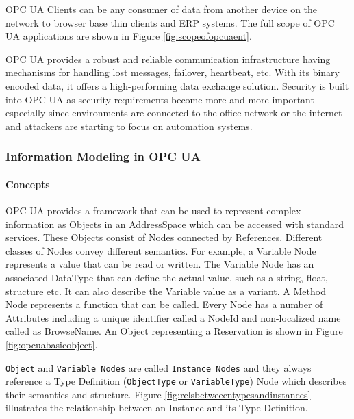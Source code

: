 OPC UA Clients can be any consumer of data from another device on the network to browser base thin clients and ERP systems. The full scope of OPC UA applications are shown in Figure \ref{fig:scopeofopcuaent}.


\FloatBarrier

OPC UA provides a robust and reliable communication infrastructure having mechanisms for handling lost messages, failover, heartbeat, etc. With its binary encoded data, it offers a high-performing data exchange solution. Security is built into OPC UA as security requirements become more and more important especially since environments are connected to the office network or the internet and attackers are starting to focus on automation systems.

\subsubsection{Information Modeling in OPC UA}

\paragraph{Concepts}

OPC UA provides a framework that can be used to represent complex information as Objects in an AddressSpace which can be accessed with standard services. These Objects consist of Nodes connected by References. Different classes of Nodes convey different semantics. For example, a Variable Node represents a value that can be read or written. The Variable Node has an associated DataType that can define the actual value, such as a string, float, structure etc. It can also describe the Variable value as a variant. A Method Node represents a function that can be called. Every Node has a number of Attributes including a unique identifier called a NodeId and non-localized name called as BrowseName. An Object representing a Reservation is shown in Figure \ref{fig:opcuabasicobject}.



\FloatBarrier

\texttt{Object} and \texttt{Variable Nodes} are called \texttt{Instance Nodes} and they always reference a Type Definition (\texttt{ObjectType} or \texttt{VariableType}) Node which describes their semantics and structure. Figure \ref{fig:relsbetweeentypesandinstances} illustrates the relationship between an Instance and its Type Definition.

